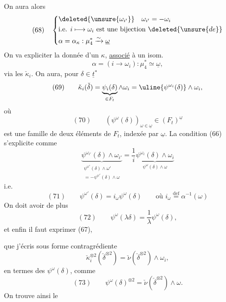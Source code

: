 On aura alors
\[
(68)\quad\left\{\begin{aligned}
&\deleted{\unsure{\omega_{i'}}}\quad\omega_{i'}=-\omega_i\\
&\text{i.e. }i\longmapsto\omega_i\text{ est une bijection }\deleted{\unsure{de}}\\
&\alpha=\alpha_\kappa:\mu_4^*\xrightarrow{\sim}\underline\omega
\end{aligned}\right.
\]
On va expliciter la donnée d'un $\kappa$,
\uline{associé} à un isom.
\[
\alpha=(i\longrightarrow\omega_i):\mu_4^*\simeq\underline\omega,
\]
\deleted{\unsure{$\alpha$}}
via les $\check\kappa_i$. On aura, pour $\delta\in\underline t^*$
\[
(69)\qquad\check\kappa_i(\check\delta)
=\underbrace{\psi_i(\delta)}_{\in F_t}\wedge\omega_i
=\uline{\psi^{\omega_i}(\delta)}\wedge\omega_i,
\]
où
\[
(70)\qquad(\psi^\omega(\delta))_{\omega\in\underline\omega}\in(F_t)^{\underline\omega}
\]
est une famille de  deux éléments de $F_t$,
indexée par $\underline\omega$. La condition (66)
s'explicite comme
\[
\underbrace{\psi^{\omega_{i'}}(\delta)\wedge\omega_{i'}}_{
\substack{\psi^{\omega'}(\delta)\wedge\omega'\\=-\psi^{\omega'}(\delta)\wedge\omega}}
=\frac1i\underbrace{\psi^{\omega_i}(\delta)\wedge\omega_i}_{\psi^\omega(\delta)\wedge\omega}
\]
i.e.
\[
(71)\qquad\psi^{\omega'}(\delta)=i_\omega\psi^\omega(\delta)
\qquad\text{où }i_\omega\overset{\mathrm{def}}=\alpha^{-1}(\omega)
\]
On doit avoir de plus
\[
(72)\qquad\psi^\omega(\lambda\delta)=\frac1\lambda\psi^\omega(\delta),
\]
 et enfin il faut exprimer (67),

que j'écris sous forme contragrédiente
\[
\check\kappa_i^{\otimes2}(\check\delta^{\otimes2})
=\check\nu(\check\delta^{\otimes2})\wedge\omega_i,
\]
en termes des $\psi^\omega(\delta)$, comme
\[
(73)\qquad\psi^\omega(\delta)^{\otimes2}
=\check\nu(\check\delta^{\otimes2})\wedge\omega.
\]
On trouve ainsi le

